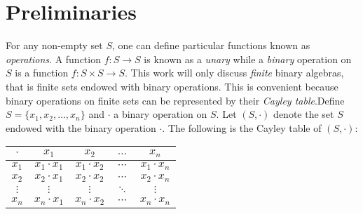 \chapter{Preliminaries}\label{preliminaries}

\label{introlqg}
\noindent For any non-empty set $S$, one can define particular functions known as \emph{operations}. A function $f : S \to S$ is known as a \emph{unary} while a \emph{binary} operation on $S$ is a function $f : S\times S \to S$.\newline
\noindent This work will only discuss \emph{finite} binary algebras, that is finite sets endowed with binary operations. This is convenient  because binary operations on finite sets can be represented by their \emph{Cayley table}.\newline Define $S= \{x_1, x_2, \dots, x_n\}$ and $\cdot$ a binary operation on $S$. \newline Let $(S, \cdot)$ denote the set $S$ endowed with the binary operation $\cdot$. \newline The following is the Cayley table of $(S, \cdot)$:\newline 
    
    \begin{center}
        \begin{tabular}{c|c c c c}
             $\cdot$ & $x_1$ & $x_2$ & $\hdots$ & $x_n$ \\
             \hline
               $x_1$ & $x_1\cdot x_1$ & $x_1\cdot x_2$ & $\cdots$ & $x_1\cdot x_n$ \\
               $x_2$ & $x_2\cdot x_1$ & $x_2\cdot x_2$ & $\cdots$ & $x_2\cdot x_n$ \\
               $\vdots$ & $\vdots$ & $\vdots$ & $\ddots$ & $\vdots$ \\
               $x_n$ & $x_n\cdot x_1$ & $x_n\cdot x_2$ & $\cdots$ & $x_n\cdot x_n$ \\
             
        \end{tabular}
    \end{center}



